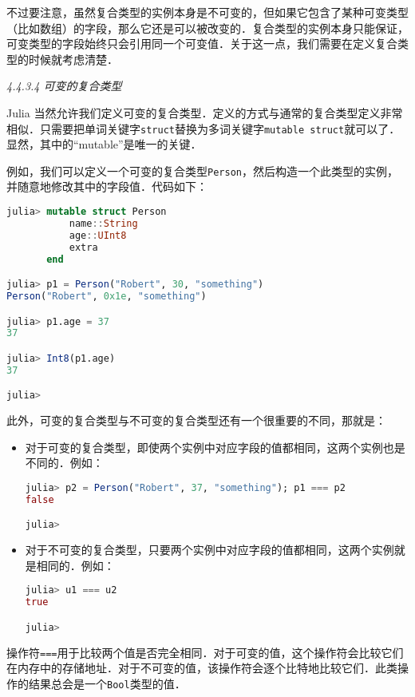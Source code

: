 不过要注意，虽然复合类型的实例本身是不可变的，但如果它包含了某种可变类型（比如数组）的字段，那么它还是可以被改变的．复合类型的实例本身只能保证，可变类型的字段始终只会引用同一个可变值．关于这一点，我们需要在定义复合类型的时候就考虑清楚．

\textsl{4.4.3.4 可变的复合类型}

Julia 当然允许我们定义可变的复合类型．定义的方式与通常的复合类型定义非常相似．只需要把单词关键字\verb|struct|替换为多词关键字\verb|mutable struct|就可以了．显然，其中的“mutable”是唯一的关键．

例如，我们可以定义一个可变的复合类型\verb|Person|，然后构造一个此类型的实例，并随意地修改其中的字段值．代码如下：

\begin{lstlisting}[language=julia]
julia> mutable struct Person
           name::String
           age::UInt8
           extra
       end

julia> p1 = Person("Robert", 30, "something")
Person("Robert", 0x1e, "something")

julia> p1.age = 37
37

julia> Int8(p1.age)
37

julia> 
\end{lstlisting}

此外，可变的复合类型与不可变的复合类型还有一个很重要的不同，那就是：

\begin{itemize}
\item 对于可变的复合类型，即使两个实例中对应字段的值都相同，这两个实例也是不同的．例如：

\begin{lstlisting}[language=julia]
julia> p2 = Person("Robert", 37, "something"); p1 === p2
false

julia> 
\end{lstlisting}

\item 对于不可变的复合类型，只要两个实例中对应字段的值都相同，这两个实例就是相同的．例如：

\begin{lstlisting}[language=julia]
julia> u1 === u2
true

julia> 
\end{lstlisting}

\end{itemize}
操作符\verb|===|用于比较两个值是否完全相同．对于可变的值，这个操作符会比较它们在内存中的存储地址．对于不可变的值，该操作符会逐个比特地比较它们．此类操作的结果总会是一个\verb|Bool|类型的值．

